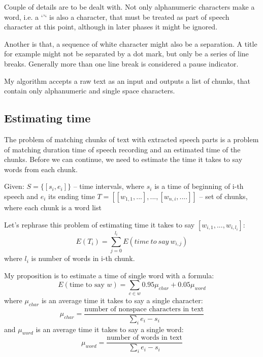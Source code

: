 \documentclass[12pt,a4paper,english]{article}
\begin{document}
Couple of details are to be dealt with. Not only alphanumeric characters make a word, i.e. a `'` is also a character, that must be treated as part of speech character at this point, although in later phases it might be ignored. \newline

Another is that, a sequence of white character might also be a separation. A title for example might not be separated by a dot mark, but only be a series of line breaks. Generally more than one line break is considered a pause indicator. \newline

My algorithm accepts a raw text as an input and outputs a list of chunks, that contain only alphanumeric and single space characters.

\newpage

\subsection{Estimating time}

The problem of matching chunks of text with extracted speech parts is a problem of matching duration time of speech recording and
an estimated time of the chunks. Before we can continue, we need to estimate the time it takes to say words from each chunk. \newline

Given: \newline
	 $S=\{[s_i, e_i]\}$	– time intervals, where $s_i$ is a time of beginning of i-th speech and $e_i$ its ending time  \newline
	 $T = [[w_{1, 1}, ...], ..., [w_{n, i}, ....] ]$	– set of chunks, where each chunk is a word list \newline

Let's rephrase this problem of estimating time it takes to say $[w_{i, 1}, ..., w_{i, l_i}]$:
\begin {equation}
    E(T_i) = \sum_{j=0}^{l_i} E(time \: to \: say \: w_{i, j})
\end {equation}
where $l_i$ is number of words in i-th chunk. \newline

My proposition is to estimate a time of single word with a formula:
\begin {equation}
    E(\text{time to say }w) = \sum_{c \in w} 0.95 \mu_{char} + 0.05 \mu_{word}
\end {equation}
where  $\mu_{char}$ is an average time it takes to say a single character:
\begin {equation}
    \mu_{char} = \frac {\text{number of nonspace characters in text}} {\sum_i e_i - s_i}
\end {equation}
and $\mu_{word}$ is an average time it takes to say a single word:
\begin {equation}
    \mu_{word} = \frac {\text{number of words in text}} {\sum_i e_i - s_i}
\end {equation}
	
\end{document}
